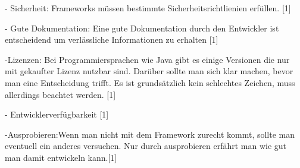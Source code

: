 - Sicherheit: Frameworks müssen bestimmte Sicherheitsrichtlienien erfüllen. [1]

- Gute Dokumentation: Eine gute Dokumentation durch den Entwickler ist entscheidend um verlässliche Informationen zu erhalten [1]

-Lizenzen: Bei Programmiersprachen wie Java gibt es einige Versionen die nur mit gekaufter Lizenz nutzbar sind. Darüber sollte man sich klar machen, bevor man eine Entscheidung trifft. Es ist grundsätzlich kein schlechtes Zeichen, muss allerdings beachtet werden. [1]

- Entwicklerverfügbarkeit [1]

-Ausprobieren:Wenn man nicht mit dem Framework zurecht kommt, sollte man eventuell ein anderes versuchen. Nur durch ausprobieren erfährt man wie gut man damit entwickeln kann.[1]
